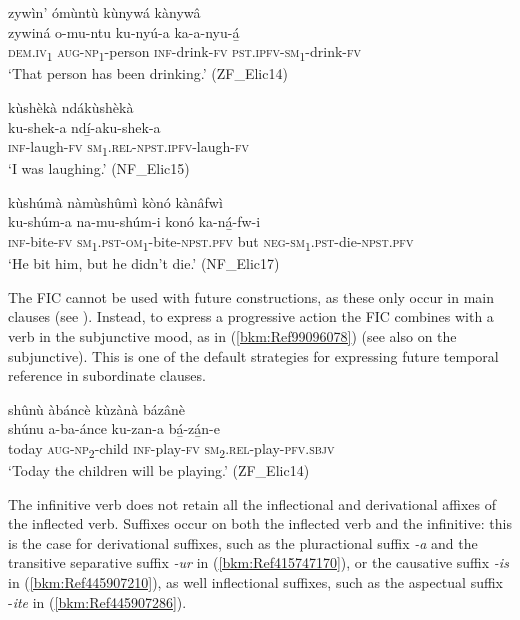 \ea
\label{bkm:Ref440616266}
zywìn’ ómùntù kùnywá kànywâ\\
\gll zywiná  o-mu-ntu    ku-nyú-a    ka-a-nyu-á̲\\
\textsc{dem}.\textsc{iv}\textsubscript{1}  \textsc{aug}-\textsc{np}\textsubscript{1}-person  \textsc{inf}-drink-\textsc{fv}    \textsc{pst}.\textsc{ipfv}-\textsc{sm}\textsubscript{1}-drink-\textsc{fv}\\
\glt ‘That person has been drinking.’ (ZF\_Elic14)
\z

\ea
\label{bkm:Ref506305666}
kùshèkà ndákùshèkà\\
\gll ku-shek-a    ndí̲-aku-shek-a\\
\textsc{inf}-laugh-\textsc{fv}  \textsc{sm}\textsubscript{1}.\textsc{rel}-\textsc{npst}.\textsc{ipfv}-laugh-\textsc{fv}\\
\glt ‘I was laughing.’ (NF\_Elic15)
\z

\ea
\label{bkm:Ref506300540}
kùshúmà nàmùshûmì kònó kànâfwì\\
\gll ku-shúm-a  na-mu-shúm-i      konó  ka-ná̲-fw-i  \\
\textsc{inf}-bite-\textsc{fv}  \textsc{sm}\textsubscript{1}.\textsc{pst}-\textsc{om}\textsubscript{1}-bite-\textsc{npst}.\textsc{pfv}  but  \textsc{neg}-\textsc{sm}\textsubscript{1}.\textsc{pst}-die-\textsc{npst}.\textsc{pfv}\\
\glt ‘He bit him, but he didn’t die.’ (NF\_Elic17)
\z

The FIC cannot be used with future constructions, as these only occur in main clauses (see ). Instead, to express a progressive action the FIC combines with a verb in the subjunctive mood, as in (\ref{bkm:Ref99096078}) (see also  on the subjunctive). This is one of the default strategies for expressing future temporal reference in subordinate clauses.

\ea
\label{bkm:Ref99096078}
shûnù àbáncè kùzànà bázânè\\
\gll shúnu  a-ba-ánce    ku-zan-a  bá̲-zá̲n-e\\
today  \textsc{aug}-\textsc{np}\textsubscript{2}-child  \textsc{inf}-play-\textsc{fv}  \textsc{sm}\textsubscript{2}.\textsc{rel}-play-\textsc{pfv}.\textsc{sbjv}\\
\glt ‘Today the children will be playing.’ (ZF\_Elic14)
\z

The infinitive verb does not retain all the inflectional and derivational affixes of the inflected verb. Suffixes occur on both the inflected verb and the infinitive: this is the case for derivational suffixes, such as the pluractional suffix \textit{-a} and the transitive separative suffix \textit{-ur} in (\ref{bkm:Ref415747170}), or the causative suffix \textit{-is} in (\ref{bkm:Ref445907210}), as well inflectional suffixes, such as the aspectual suffix -\textit{ite} in (\ref{bkm:Ref445907286}).

